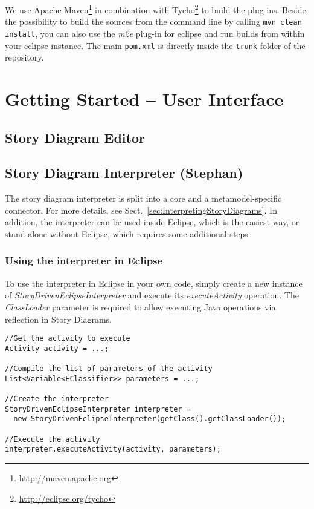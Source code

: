 We use Apache Maven\footnote{\url{http://maven.apache.org}} in combination with Tycho\footnote{\url{http://eclipse.org/tycho}} to build the plug-ins. Beside the possibility to build the sources from the command line by calling \texttt{mvn clean install}, you can also use the \emph{m2e} plug-in for eclipse and run builds from within your eclipse instance. The main \texttt{pom.xml} is directly inside the \texttt{trunk} folder of the repository.

\section{Getting Started -- User Interface}

\subsection{Story Diagram Editor}

\subsection{Story Diagram Interpreter (Stephan)}

The story diagram interpreter is split into a core and a metamodel-specific connector. For more details, see Sect.~\ref{sec:InterpretingStoryDiagrams}. In addition, the interpreter can be used inside Eclipse, which is the easiest way, or stand-alone without Eclipse, which requires some additional steps.

\subsubsection{Using the interpreter in Eclipse}

To use the interpreter in Eclipse in your own code, simply create a new instance of \emph{StoryDrivenEclipseInterpreter} and execute its \emph{executeActivity} operation. The \emph{ClassLoader} parameter is required to allow executing Java operations via reflection in Story Diagrams.

\begin{verbatim}
//Get the activity to execute
Activity activity = ...;

//Compile the list of parameters of the activity
List<Variable<EClassifier>> parameters = ...;

//Create the interpreter
StoryDrivenEclipseInterpreter interpreter = 
  new StoryDrivenEclipseInterpreter(getClass().getClassLoader());
	
//Execute the activity
interpreter.executeActivity(activity, parameters);
\end{verbatim}

